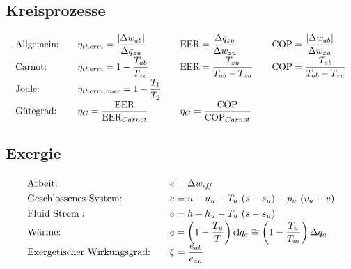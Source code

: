 \subsection{Kreisprozesse}
%
	\skipabove{-25pt}
	\[ \arraycolsep=1em \def\arraystretch{1.8}
	\begin{array}{llll}
		\text{Allgemein:} & \eta_{therm} = \dfrac{\abs{\Delta w_{ab}}} {\Delta q_{zu}} & \text{EER} = \dfrac{\Delta q_{zu}}{\Delta w_{zu}}    & \text{COP} = \dfrac{\abs{\Delta w_{ab}}}{\Delta w_{zu}} \\
		\text{Carnot:}    & \eta_{therm} = 1- \dfrac{T_{ab}}{T_{zu}}                   & \text{EER} = \dfrac{T_{zu}}{T_{ab} - T_{zu}}         & \text{COP} = \dfrac{T_{ab}}{T_{ab} - T_{zu}}            \\
		\text{Joule:}     & \eta_{therm,max} = 1 - \dfrac{T_1}{T_2}                    &                                                      &                                                         \\
		\text{Gütegrad:}  & \eta_G = \dfrac{\mathrm{EER}}{\mathrm{EER}_{Carnot}}       & \eta_G = \dfrac{\mathrm{COP}}{\mathrm{COP}_{Carnot}} &
	\end{array} \]

\subsection{Exergie}
	\skipabove{-20pt}
	\[ \arraycolsep=1em \def\arraystretch{1.3}
	\begin{array}{ll}
		\text{Arbeit:}                     & e = \Delta w_{\eff}                                                                                             \\
		\text{Geschlossenes System:}       & e = u - u_u - T_u\ (s-s_u) - p_u\ (v_u-v)                                                                       \\
		\text{Fluid Strom}:                & e = h - h_u - T_u\ (s-s_u)                                                                                      \\
		\text{Wärme:}                      & e = \displaystyle\left(1-\dfrac{T_u}{T} \right) \dd q_a  \cong \left(1-\dfrac{T_u}{T_m} \right) \Delta q_a \\
		\text{Exergetischer Wirkungsgrad:} & \zeta = \dfrac{e_{ab}}{e_{zu}}
	\end{array} \]
